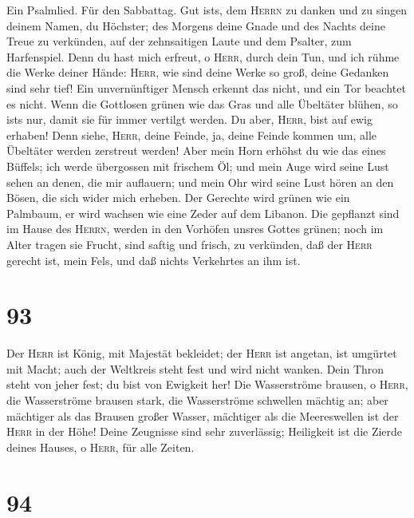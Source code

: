  Ein Psalmlied. Für den Sabbattag. Gut
ist\textquotesingle s, dem \textsc{Herrn} zu danken und zu singen deinem
Namen, du Höchster;  des Morgens deine Gnade und des
Nachts deine Treue zu verkünden,  auf der zehnsaitigen
Laute und dem Psalter, zum Harfenspiel.  Denn du hast mich
erfreut, o \textsc{Herr}, durch dein Tun, und ich rühme die Werke deiner
Hände:  \textsc{Herr}, wie sind deine Werke so groß, deine
Gedanken sind sehr tief!  Ein unvernünftiger Mensch
erkennt das nicht, und ein Tor beachtet es nicht.  Wenn
die Gottlosen grünen wie das Gras und alle Übeltäter blühen, so
ist\textquotesingle s nur, damit sie für immer vertilgt werden.
 Du aber, \textsc{Herr}, bist auf ewig erhaben!
 Denn siehe, \textsc{Herr}, deine Feinde, ja, deine Feinde
kommen um, alle Übeltäter werden zerstreut werden!  Aber
mein Horn erhöhst du wie das eines Büffels; ich werde übergossen mit
frischem Öl;  und mein Auge wird seine Lust sehen an
denen, die mir auflauern; und mein Ohr wird seine Lust hören an den
Bösen, die sich wider mich erheben.  Der Gerechte wird
grünen wie ein Palmbaum, er wird wachsen wie eine Zeder auf dem Libanon.
 Die gepflanzt sind im Hause des \textsc{Herrn}, werden
in den Vorhöfen unsres Gottes grünen;  noch im Alter
tragen sie Frucht, sind saftig und frisch,  zu verkünden,
daß der \textsc{Herr} gerecht ist, mein Fels, und daß nichts Verkehrtes
an ihm ist.

\hypertarget{section-92}{%
\section{93}\label{section-92}}

 Der \textsc{Herr} ist König, mit Majestät bekleidet; der
\textsc{Herr} ist angetan, ist umgürtet mit Macht; auch der Weltkreis
steht fest und wird nicht wanken.  Dein Thron steht von
jeher fest; du bist von Ewigkeit her!  Die Wasserströme
brausen, o \textsc{Herr}, die Wasserströme brausen stark, die
Wasserströme schwellen mächtig an;  aber mächtiger als das
Brausen großer Wasser, mächtiger als die Meereswellen ist der
\textsc{Herr} in der Höhe!  Deine Zeugnisse sind sehr
zuverlässig; Heiligkeit ist die Zierde deines Hauses, o \textsc{Herr},
für alle Zeiten.

\hypertarget{section-93}{%
\section{94}\label{section-93}}

